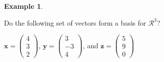 \documentclass[
]{book}
\theoremstyle{definition}
\theoremstyle{definition}
\newtheorem{example}{Example}[chapter]
\theoremstyle{definition}
\theoremstyle{remark}
\begin{document}
\begin{example}
\protect\hypertarget{exm:unlabeled-div-90}{}\label{exm:unlabeled-div-90}

Do the following set of vectors form a basis for \(\mathcal{R}^3\)?

\(\mathbf{x} = \begin{pmatrix} 4 \\ 3 \\ 2 \end{pmatrix}\), \(\mathbf{y} = \begin{pmatrix} 3 \\ -3 \\ 4 \end{pmatrix}\), and \(\mathbf{z} = \begin{pmatrix} 5 \\ 9 \\ 0 \end{pmatrix}\)

\end{example}
\end{document}
